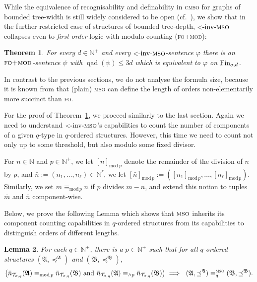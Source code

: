 \documentclass[11pt]{article}
\newtheorem{theorem}{Theorem}
\newtheorem{lemma}[theorem]{Lemma}
\renewcommand{\phi}{\varphi}
\newcommand{\fin}{\textup{Fin}}
\newcommand{\logic}[1]{\textsc{#1}}
\newcommand{\FO}{\logic{fo}}
\newcommand{\FOmod}{\logic{fo+mod}}
\newcommand{\MSO}{\logic{mso}}
\newcommand{\CMSO}{\logic{cmso}}
\newcommand{\ordinv}[1]{\textnormal{{\small \textless}-inv-}#1}
\newcommand{\oiMSO}{\ordinv{\MSO{}}}
\newcommand{\eleq}[1][]{\equiv_{#1}}
\newcommand{\msoeleq}[1][]{\eleq[#1]^{\MSO{}}}
\newcommand{\types}[1][\sigma,q,d]{\mathcal{T}_{#1}}
\newcommand{\maxeq}[1]{\equiv_{{\wedge}#1}}
\newcommand{\modeq}[1]{\equiv_{\mathrm{mod}\,#1}}
\newcommand{\redmod}[2]{[#1]_{\mathrm{mod}\,#2}}
\newcommand{\qad}[1]{\operatorname{qad}(#1)}
\newcommand{\struct}[1]{\mathfrak{#1}}
\newcommand{\AS}{\struct{A}}
\newcommand{\BS}{\struct{B}}
\newcommand{\N}{\mathbb{N}}
\newcommand{\Npos}{\mathbb{N}^{+}}
\begin{document}
While the equivalence of recognisability and definability in \CMSO{} for graphs
of bounded tree-width is still widely considered to be open
(cf.~\cite[p.~574]{CourcelleE2012}), we show that in the further restricted case
of structures of bounded tree-depth, $\oiMSO$ collapses even to
\emph{first-order} logic with modulo counting (\FOmod{}):

\begin{theorem}
  \label{thm:oimso-eq-fomod}
  For every $d\in \Npos$ and every $\oiMSO{}$-sentence $\phi$ there is an
  $\FOmod{}$-sentence $\psi$ with $\qad{\psi} \leq 3d$
  which is equivalent to $\phi$ on $\fin_{\sigma,d}$.
\end{theorem}

In contrast to the previous sections, we do not analyse the formula size,
because it is known from \cite{GroheSchweikardt05} that (plain) \MSO{} can
define the length of orders non-elementarily more succinct than \FO{}.

For the proof of Theorem~\ref{thm:oimso-eq-fomod}, we proceed similarly to the
last section. Again we need to understand $\oiMSO{}$'s capabilities to count the
number of components of a given $q$-type in $q$-ordered structures. However,
this time we need to count not only up to some threshold, but also modulo some
fixed divisor.

For $n\in \N$ and $p\in \Npos$, we let $\redmod{n}{p}$ denote the remainder of
the division of $n$ by $p$, and $\bar n := (n_1, \ldots, n_\ell)\in \N^\ell$, we
let $\redmod{\bar n}{p} := (\redmod{n_1}{p},\ldots, \redmod{n_\ell}{p})$.
Similarly, we set $m \modeq{p} n$ if $p$ divides $m-n$, and extend this notion
to tuples $\bar m$ and $\bar n$ component-wise.

Below, we prove the following Lemma which shows that $\MSO{}$ inherits its
component counting capabilities in $q$-ordered structures from its
capabilities to distinguish orders of different lengths.

\begin{lemma}
  \label{lem:oimso-cut}
  For each $q\in \Npos$, there is a $p\in \Npos$ such that for all
  $q$-ordered structures $(\AS,\preceq^\AS)$ and $(\BS,\preceq^\BS)$,
  \[ 
  \left(
    {\bar n}_{\types[\sigma,q]}(\AS) \modeq{p} {\bar n}_{\types[\sigma,q]}(\BS)
    \text{ and }
    {\bar n}_{\types[\sigma,q]}(\AS) \maxeq{p} {\bar n}_{\types[\sigma,q]}(\BS)
  \right)
  \implies \ (\AS,\preceq^\AS) \msoeleq[q] (\BS,\preceq^\BS) . \]
\end{lemma}
\end{document}
